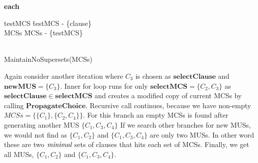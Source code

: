 \begin{example}
\begin{Algorithm}
\begin{algorithm}{}{}
\begin{FOR}{\textbf{each} }
			\begin{IF}{}
				testMCS \= testMCS - \{clause\} \\
				MCSs \= MCSs - \{testMCS\} \\
			\end{IF}
		\end{FOR}\\
		MaintainNoSupersets(MCSs)
	\end{algorithm}
\end{Algorithm}
	Again consider another iteration where $C_{3}$ is chosen as $\mathbf{selectClause}$ and $\mathbf{newMUS}=\{C_{3}\}$. Inner for loop runs for only $\mathbf{selectMCS}=\{C_{2}, C_{3}\}$ as $\mathbf{selectClause}\in \mathbf{selectMCS}$ and creates a modified copy of current MCSs by calling $\mathbf{PropagateChoice}$. Recursive call continues, because we have non-empty $MCSs=\{\{C_{1}\}, \{C_{2}, C_{4}\}\}$. For this branch an empty MCSs is found after generating another MUS $\{C_{1}, C_{3}, C_{4}\}$
		If we search other branches for new MUSs, we would not find as $\{C_{1}, C_{2}\}$ and $\{C_{1}, C_{3}, C_{4}\}$ are only two MUSs. In other word these are two $\emph{minimal}$ sets of clauses that hits each set of MCSs.
		Finally, we get all MUSs, $\{C_{1}, C_{2}\}$ and $\{C_{1},C_{3}, C_{4}\}$.
\end{example}